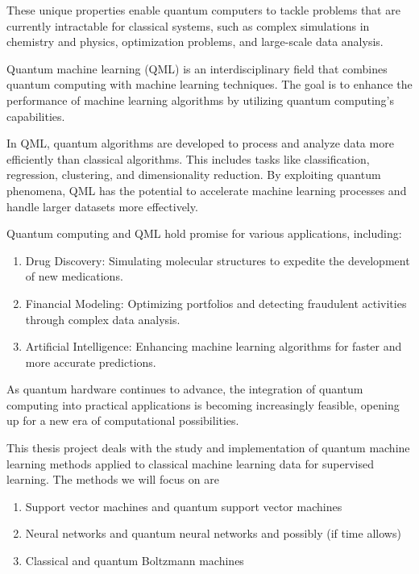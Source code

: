 \documentclass[%
oneside,                 %
final,                   %
10pt]{article}
\begin{document}
These unique properties enable quantum computers to tackle problems
that are currently intractable for classical systems, such as complex
simulations in chemistry and physics, optimization problems, and
large-scale data analysis.

Quantum machine learning (QML) is an interdisciplinary field that
combines quantum computing with machine learning techniques. The goal
is to enhance the performance of machine learning algorithms by
utilizing quantum computing’s capabilities.

In QML, quantum algorithms are developed to process and analyze data
more efficiently than classical algorithms. This includes tasks like
classification, regression, clustering, and dimensionality
reduction. By exploiting quantum phenomena, QML has the potential to
accelerate machine learning processes and handle larger datasets more
effectively.

Quantum computing and QML hold promise for various applications, including:

\begin{enumerate}
\item Drug Discovery: Simulating molecular structures to expedite the development of new medications.

\item Financial Modeling: Optimizing portfolios and detecting fraudulent activities through complex data analysis.

\item Artificial Intelligence: Enhancing machine learning algorithms for faster and more accurate predictions. 
\end{enumerate}

\noindent
As quantum hardware continues to advance, the integration of quantum
computing into practical applications is becoming increasingly
feasible, opening up for  a new era of computational possibilities.

This thesis project deals with the study and implementation of quantum
machine learning methods applied to classical machine learning data
for supervised learning.
The methods we will focus on are
\begin{enumerate}
\item Support vector machines and quantum support vector machines

\item Neural networks and quantum neural networks and possibly (if time allows)

\item Classical and quantum Boltzmann machines
\end{enumerate}
\end{document}
